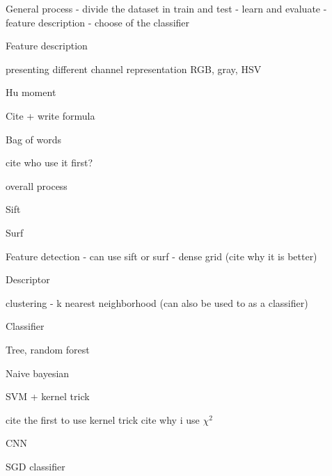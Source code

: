 General process
- divide the dataset in train and test
- learn and evaluate
- feature description
- choose of the classifier

Feature description

presenting different channel representation
RGB, gray, HSV

Hu moment

Cite + write formula

Bag of words

cite who use it first?

overall process

Sift

Surf

Feature detection
- can use sift or surf
- dense grid (cite why it is better)

Descriptor

clustering
- k nearest neighborhood (can also be used to as a classifier)

Classifier

Tree, random forest

Naive bayesian

SVM + kernel trick

cite the first to use kernel trick
cite why i use $\chi^2$

CNN

SGD classifier
